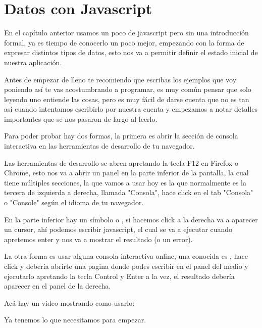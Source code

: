\documentclass[letterpaper,10pt,spanish]{sphinxmanual}
\begin{document}
\chapter{Datos con Javascript}
\label{\detokenize{datos-con-javascript::doc}}\label{\detokenize{datos-con-javascript:datos-con-javascript}}
En el capítulo anterior {\hyperref[\detokenize{un-poco-de-logica-a-la-vista::doc}]{}}
usamos un poco de javascript pero sin una introducción formal, ya es tiempo de
conocerlo un poco mejor, empezando con la forma de expresar distintos tipos de
datos, esto nos va a permitir definir el estado inicial de nuestra aplicación.

Antes de empezar de lleno te recomiendo que escribas los ejemplos que voy
poniendo así te vas acostumbrando a programar, es muy común pensar que solo
leyendo uno entiende las cosas, pero es muy fácil de darse cuenta que no es tan
así cuando intentamos escribirlo por nuestra cuenta y empezamos a notar
detalles importantes que se nos pasaron de largo al leerlo.

Para poder probar hay dos formas, la primera es abrir la sección de
consola interactiva en las herramientas de desarrollo de tu navegador.

Las herramientas de desarrollo se abren apretando la tecla F12 en Firefox o
Chrome, esto nos va a abrir un panel en la parte inferior de la pantalla, la
cual tiene múltiples secciones, la que vamos a usar hoy es la que normalmente
es la tercera de izquierda a derecha, llamada "Consola", hace click en el tab
"Consola" o "Console" según el idioma de tu navegador.

En la parte inferior hay un símbolo \sphinxtitleref{\textgreater{}} o \sphinxtitleref{\textgreater{}\textgreater{}}, si hacemos click a la derecha
va a aparecer un cursor, ahí podemos escribir javascript, el cual se va a
ejecutar cuando apretemos enter y nos va a mostrar el resultado (o un error).

La otra forma es usar alguna consola interactiva online, una conocida es
, hace click y debería abrirte
una pagina donde podes escribir en el panel del medio y ejecutarlo apretando la
tecla Control y Enter a la vez, el resultado debería aparecer en el panel de la
derecha.

Acá hay un video mostrando como usarlo:



Ya tenemos lo que necesitamos para empezar.
\end{document}
